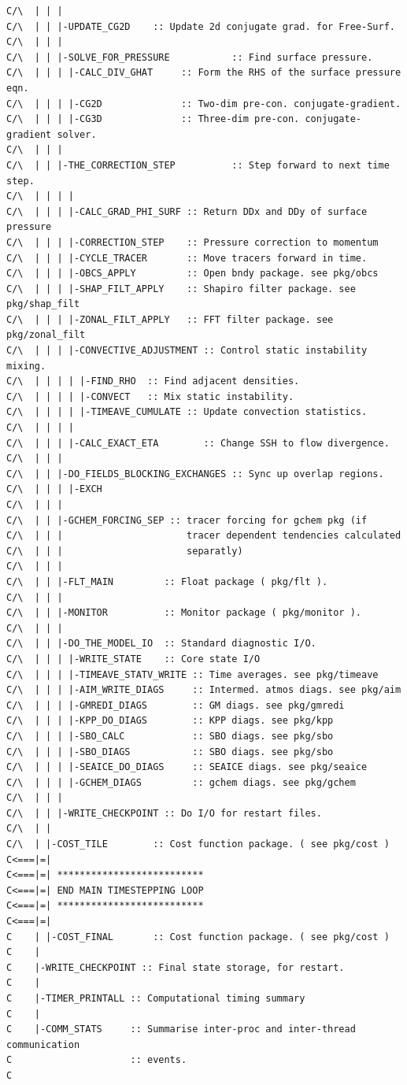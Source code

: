 {\begin{verbatim}
C/\  | | |
C/\  | | |-UPDATE_CG2D    :: Update 2d conjugate grad. for Free-Surf.
C/\  | | |
C/\  | | |-SOLVE_FOR_PRESSURE           :: Find surface pressure.
C/\  | | | |-CALC_DIV_GHAT     :: Form the RHS of the surface pressure eqn.
C/\  | | | |-CG2D              :: Two-dim pre-con. conjugate-gradient.
C/\  | | | |-CG3D              :: Three-dim pre-con. conjugate-gradient solver.
C/\  | | |
C/\  | | |-THE_CORRECTION_STEP          :: Step forward to next time step.
C/\  | | | |
C/\  | | | |-CALC_GRAD_PHI_SURF :: Return DDx and DDy of surface pressure
C/\  | | | |-CORRECTION_STEP    :: Pressure correction to momentum
C/\  | | | |-CYCLE_TRACER       :: Move tracers forward in time.
C/\  | | | |-OBCS_APPLY         :: Open bndy package. see pkg/obcs
C/\  | | | |-SHAP_FILT_APPLY    :: Shapiro filter package. see pkg/shap_filt
C/\  | | | |-ZONAL_FILT_APPLY   :: FFT filter package. see pkg/zonal_filt
C/\  | | | |-CONVECTIVE_ADJUSTMENT :: Control static instability mixing.
C/\  | | | | |-FIND_RHO  :: Find adjacent densities.
C/\  | | | | |-CONVECT   :: Mix static instability.
C/\  | | | | |-TIMEAVE_CUMULATE :: Update convection statistics.
C/\  | | | | 
C/\  | | | |-CALC_EXACT_ETA        :: Change SSH to flow divergence.     
C/\  | | |
C/\  | | |-DO_FIELDS_BLOCKING_EXCHANGES :: Sync up overlap regions.
C/\  | | | |-EXCH                                                   
C/\  | | |
C/\  | | |-GCHEM_FORCING_SEP :: tracer forcing for gchem pkg (if
C/\  | | |                      tracer dependent tendencies calculated
C/\  | | |                      separatly)
C/\  | | |
C/\  | | |-FLT_MAIN         :: Float package ( pkg/flt ).
C/\  | | |
C/\  | | |-MONITOR          :: Monitor package ( pkg/monitor ).
C/\  | | |
C/\  | | |-DO_THE_MODEL_IO  :: Standard diagnostic I/O.
C/\  | | | |-WRITE_STATE    :: Core state I/O
C/\  | | | |-TIMEAVE_STATV_WRITE :: Time averages. see pkg/timeave
C/\  | | | |-AIM_WRITE_DIAGS     :: Intermed. atmos diags. see pkg/aim
C/\  | | | |-GMREDI_DIAGS        :: GM diags. see pkg/gmredi
C/\  | | | |-KPP_DO_DIAGS        :: KPP diags. see pkg/kpp
C/\  | | | |-SBO_CALC            :: SBO diags. see pkg/sbo
C/\  | | | |-SBO_DIAGS           :: SBO diags. see pkg/sbo
C/\  | | | |-SEAICE_DO_DIAGS     :: SEAICE diags. see pkg/seaice
C/\  | | | |-GCHEM_DIAGS         :: gchem diags. see pkg/gchem
C/\  | | |
C/\  | | |-WRITE_CHECKPOINT :: Do I/O for restart files.
C/\  | |
C/\  | |-COST_TILE        :: Cost function package. ( see pkg/cost )
C<===|=|
C<===|=| **************************
C<===|=| END MAIN TIMESTEPPING LOOP
C<===|=| **************************
C<===|=|
C    | |-COST_FINAL       :: Cost function package. ( see pkg/cost )
C    |
C    |-WRITE_CHECKPOINT :: Final state storage, for restart.
C    |
C    |-TIMER_PRINTALL :: Computational timing summary
C    |
C    |-COMM_STATS     :: Summarise inter-proc and inter-thread communication
C                     :: events.
C
\end{verbatim}
}

